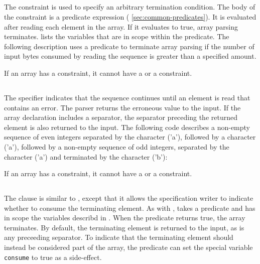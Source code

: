 \subsection{\Plast}
The \Plast{} constraint is used to specify an arbitrary termination
condition.  The body of the constraint is a predicate expression (\cf{}
\ref{sec:common-predicates}).  It is evaluated after reading each
element in the array.  If it evaluates to true, array parsing
terminates.  lists the variables that
are in scope within the predicate.
The following description uses a \Plast{} predicate to 
terminate array parsing if the number of input bytes consumed by
reading the sequence is greater than a specified amount.


If an array has a \Plast{} constraint, it cannot have a
\Plongest{} or a \Pended{} constraint.


\subsection{\Plongest{}}
The \Plongest{} specifier indicates that the sequence continues
until an element is read that contains an error.  The parser returns the
erroneous value to the input.  If the array declaration includes a
separator, the separator preceding the returned element
is also returned to the input.  The following \pads{} code describes a
non-empty sequence of even integers separated by the character
\cd('a'), followed by a character \cd('a'), followed by a non-empty
sequence of odd integers, separated by the character \cd('a') and
terminated by the character \cd('b'):


If an array has a \Plongest{} constraint, it cannot have a
\Plast{} or a \Pended{} constraint.


\subsection{\Pended}
The \Pended{} clause is similar to \Plast{}, except that it allows 
the specification writer to indicate whether to consume the terminating
element.   As with \Plast{}, \Pended{} takes a predicate and has in
scope the variables describd in .  When the
predicate returns true, the array terminates.  By default, the
terminating element is returned to the input, as is any preceeding
separator.  To indicate that the terminating element should 
instead be considered part of the array, the predicate can set the
special variable \texttt{consume} to true as a side-effect. 

